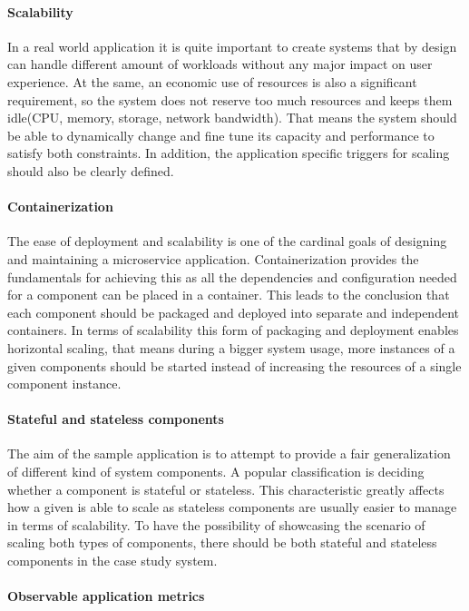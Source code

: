 \paragraph{Scalability}In a real world application it is quite important to create systems that by design can handle different amount of workloads without any major impact on user experience. At the same, an economic use of resources is also a significant requirement, so the system does not reserve too much resources and keeps them idle(\eg CPU, memory, storage, network bandwidth). That means the system should be able to dynamically change and fine tune its capacity and performance to satisfy both constraints. In addition, the application specific triggers for scaling should also be clearly defined.

\paragraph{Containerization}The ease of deployment and scalability is one of the cardinal goals of designing and maintaining a microservice application. Containerization provides the fundamentals for achieving this as all the dependencies and configuration needed for a component can be placed in a container. This leads to the conclusion that each component should be packaged and deployed into separate and independent containers.  In terms of scalability this form of packaging and deployment enables horizontal scaling, that means \eg during a bigger system usage, more instances of a given components should be started instead of increasing the resources of a single component instance.

\paragraph{Stateful and stateless components}The aim of the sample application is to attempt to provide a fair generalization of different kind of system components. A popular classification is deciding whether a component is stateful or stateless. This characteristic greatly affects how a given is able to scale as stateless components are usually easier to manage in terms of scalability. To have the possibility of showcasing the scenario of scaling both types of components, there should be both stateful and stateless components in the case study system.

\paragraph{Observable application metrics}



